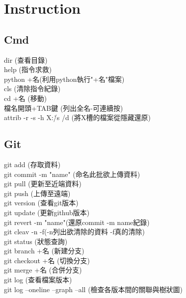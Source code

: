 \chapter{Instruction}
\section{Cmd}

dir (查看目錄)\\

help (指令求救)\\

python +名(利用python執行"+名"檔案)\\

cls (清除指令紀錄)\\

cd +名 (移動)\\

檔名開頭+TAB鍵 (列出全名-可連續按)\\

attrib -r -s -h X:\. /s /d (將X槽的檔案從隱藏還原)\\
\newpage

\section{Git}


git add (存取資料)\\

git commit -m "name" (命名此批欲上傳資料)\\

git pull (更新至近端資料)\\

git push (上傳至遠端)\\

git version (查看git版本)\\

git update (更新github版本)\\

git revert -m "name"(還原commit -m name紀錄)\\

git cleav -n -f(-n列出欲清除的資料 -f真的清除)\\

git status (狀態查詢)\\

git branch +名 (新建分支)\\

git checkout +名 (切換分支)\\

git merge +名 (合併分支)\\

git log (查看檔案版本)\\

git log --oneline --graph --all (檢查各版本間的關聯與樹狀圖)\\
